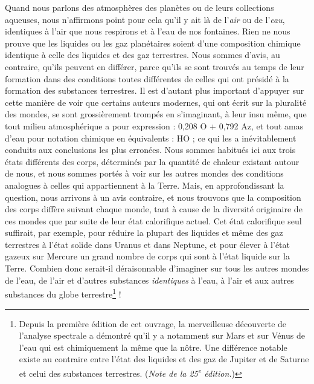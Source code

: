 \documentclass[a4paper, 11pt, oneside, landscape]{article}
\begin{document}
Quand nous parlons des atmosphères des planètes ou de leurs collections aqueuses, nous n'affirmons point pour cela qu'il y ait là de l'\emph{air} ou de l'\emph{eau}, identiques à l'air que nous respirons et à l'eau de nos fontaines. Rien ne nous prouve que les liquides ou les gaz planétaires soient d'une composition chimique identique à celle des liquides et des gaz terrestres. Nous sommes d'avis, au contraire, qu'ils peuvent en différer, parce qu'ils se sont trouvés au temps de leur formation dans des conditions toutes différentes de celles qui ont présidé à la formation des substances terrestres. Il est d'autant plus important d'appuyer sur cette manière de voir que certains auteurs modernes, qui ont écrit sur la pluralité des mondes, se sont grossièrement trompés en s'imaginant, à leur insu même, que tout milieu atmosphérique a pour expression : 0,208 O + 0,792 Az, et tout amas d'eau pour notation chimique en équivalents : HO ; ce qui les a inévitablement conduits aux conclusions les plus erronées. Nous sommes habitués ici aux trois états différents des corps, déterminés par la quantité de chaleur existant autour de nous, et nous sommes portés à voir sur les autres mondes des conditions analogues à celles qui appartiennent à la Terre. Mais, en approfondissant la question, nous arrivons à un avis contraire, et nous trouvons que la composition des corps diffère suivant chaque monde, tant à cause de la diversité originaire de ces mondes que par suite de leur état calorifique actuel. Cet état calorifique seul suffirait, par exemple, pour réduire la plupart des liquides et même des gaz terrestres à l'état solide dans Uranus et dans Neptune, et pour élever à l'état gazeux sur Mercure un grand nombre de corps qui sont à l'état liquide sur la Terre. Combien donc serait-il déraisonnable d'imaginer sur tous les autres mondes de l'eau, de l'air et d'autres substances \emph{identiques} à l'eau, à l'air et aux autres substances du globe terrestre\footnote{Depuis la première édition de cet ouvrage, la merveilleuse découverte de l'analyse spectrale a démontré qu'il y a notamment sur Mars et sur Vénus de l'eau qui est chimiquement la même que la nôtre. Une différence notable existe au contraire entre l'état des liquides et des gaz de Jupiter et de Saturne et celui des substances terrestres. (\emph{Note de la 25\textsuperscript{e} édition.})} !
\end{document}
